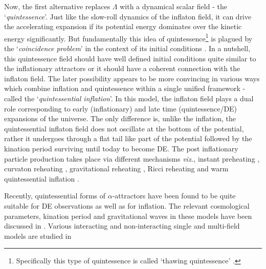 \documentclass[a4paper,11pt]{article}
\begin{document}
Now, the first alternative replaces $\Lambda$ with a dynamical scalar field - the `\textit{quintessence}'\cite{Peebles:2002gy,Ratra:1987rm,Caldwell:1997ii}. Just like the slow-roll dynamics of the inflaton field, it can drive the accelerating expansion if its potential energy dominates over the kinetic energy significantly. But fundamentally this idea of quintessence\footnote{Specifically this type of quintessence is called `thawing quintessence' \cite{Dimopoulos:2022wzo}.} is plagued by the `\textit{coincidence problem}' in the context of its initial conditions \cite{Dimopoulos:2021xld,Dimopoulos:2022wzo}. In a nutshell, this quintessence field should have well defined initial conditions quite similar to the inflationary attractors or it should have a coherent connection with the inflaton field. The later possibility appears to be more convincing in various ways \cite{Peebles:1998qn,Peloso:1999dm,Sen:2000ym,Kaganovich:2000fc,Yahiro:2001uh,Martin:2004ba,Barenboim:2005np,Rosenfeld:2005mt,Cardenas:2006py,BuenoSanchez:2006fhh,Membiela:2006rj,Rosenfeld:2006hs,Neupane:2007mu,Bastero-Gil:2009wdy,Piedipalumbo:2011bj,Wetterich:2014gaa,Hossain:2014xha,Hossain:2014coa,Hossain:2014ova,Geng:2015fla,WaliHossain:2014usl,Haro:2015ljc,deHaro:2016ftq,deHaro:2016cdm,Guendelman:2016kwj,Rubio:2017gty,Ahmad:2017itq,Haro:2018zdb,Bettoni:2018pbl,Selvaganapathy:2019bpm,Lima:2019yyv,Kleidis:2019ywv,Haro:2019peq,Benisty:2020xqm,Benisty:2020vvm,deHaro:2021swo,Dimopoulos:2021xld,Tian:2021cqq,AresteSalo:2021wgb,Akrami:2020zxw,Garcia-Garcia:2019ees,Garcia-Garcia:2018hlc,Akrami:2017cir,Kepuladze:2021tsb,Dimopoulos:2017zvq,Geng:2017mic,Agarwal:2017wxo,AresteSalo:2017lkv,DeHaro:2017abf,Haro:2019gsv,deHaro:2019oki,Benisty:2020qta,Shokri:2021zqw,Bettoni:2021qfs,Jaman:2022bho,Jesus:2021bxq,Fujikura:2022udt,Karciauskas:2021fdu,Basak:2021cgk,AresteSalo:2020yxl} which combine inflation and quintessence within a single unified framework - called the `\textit{quintessential inflation}'. In this model, the inflaton field plays a dual role corresponding to early (inflationary) and late time (quintessence/DE) expansions of the universe. The only difference is, unlike the inflation, the quintessential inflaton field does not oscillate at the bottom of the potential, rather it undergoes through a flat tail like part of the potential followed by the kination period \cite{Spokoiny:1993kt,Pallis:2005hm,Pallis:2005bb,Gomez:2008js} surviving until today to become DE. The post inflationary particle production takes place via different mechanisms \textit{viz.,} instant preheating \cite{Campos:2002yk,Dimopoulos:2017tud}, curvaton reheating \cite{Feng:2002nb,BuenoSanchez:2007jxm,Matsuda:2007ax}, gravitational reheating \cite{Chun:2009yu}, Ricci reheating \cite{Dimopoulos:2018wfg,Opferkuch:2019zbd} and warm quintessential inflation \cite{Dimopoulos:2019gpz,Rosa:2019jci,Gangopadhyay:2020bxn}.\par Recently, quintessential forms of $\alpha$-attractors have been found to be quite suitable for DE observations as well as for inflation. The relevant cosmological parameters, kination period and gravitational waves in these models have been discussed in \cite{Dimopoulos:2017zvq}. Various interacting and non-interacting single and multi-field models are studied in 
\end{document}
